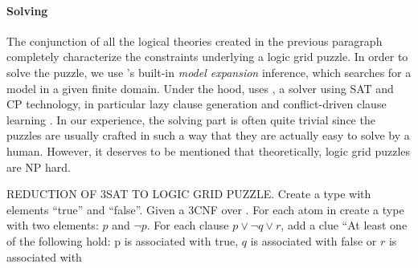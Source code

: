 

\paragraph{Solving}
The conjunction of all the logical theories created in the previous paragraph completely characterize the constraints underlying a logic grid puzzle.
In order to solve the puzzle, we use \idp's built-in \emph{model expansion} inference, which searches for a model in a given finite domain. Under the hood, \idp uses \minisatid {}, a solver using SAT  and CP  technology, in particular lazy clause generation  and conflict-driven clause learning . In our experience, the solving part is often quite trivial since the puzzles are usually crafted in such a way that they are actually easy to solve by a human. However, it deserves to be mentioned that theoretically, logic grid puzzles are NP hard.


REDUCTION OF 3SAT TO LOGIC GRID PUZZLE. 
Create a type with elements ``true'' and ``false''. 
Given a 3CNF over \voc. For each atom in \voc create a type with two elements: $p$ and $\lnot p$.
For each clause $p \lor \lnot q \lor r$, add a clue 
``At least one of the following hold: p is associated with true, $q$ is associated with false or $r$ is associated with 




